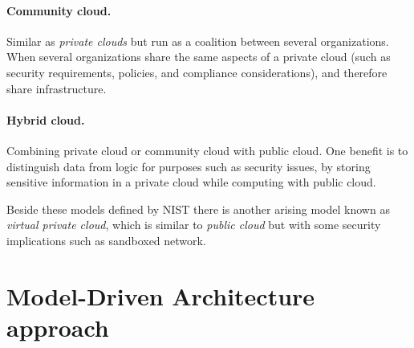 \paragraph{Community cloud.}

Similar as \emph{private clouds} but run as a
coalition between several organizations.
When several organizations share the same aspects of
a private cloud (such as security requirements, policies, and compliance considerations),
and therefore share infrastructure. 

\paragraph{Hybrid cloud.}

Combining private cloud or community cloud with public cloud.
One benefit is to distinguish data from logic for purposes such as security issues,
by storing sensitive information in a private cloud while computing with public cloud.

Beside these models defined by NIST there is another arising model known as 
\emph{virtual private cloud}, which is similar to \emph{public cloud} 
but with some security implications such as sandboxed network.

\section{Model-Driven Architecture approach}

